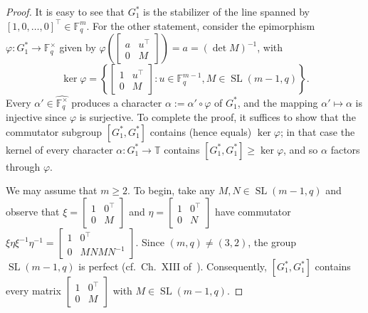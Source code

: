 \documentclass[11pt]{article}
\theoremstyle{definition}
\numberwithin{equation}{section}
\begin{document}
\begin{proof}
It is easy to see that $G_1^*$ is the stabilizer of the line spanned by $[1,0,\ldots,0]^\top\in\mathbb{F}_q^m$.
For the other statement, consider the epimorphism $\varphi \colon G_1^* \to \mathbb{F}_q^\times$ given by $\varphi\left( \begin{bmatrix} a & u^\top \\ 0 & M \end{bmatrix} \right) = a = (\det M)^{-1}$,
with
\[ \ker \varphi =\left\{
\begin{bmatrix}
1&u^\top\\0&M
\end{bmatrix}
:u\in\mathbb{F}_q^{m-1},M\in\operatorname{SL}(m-1,q)
\right\}.
\]
Every $\alpha' \in \widehat{ \mathbb{F}_q^\times }$ produces a character $\alpha := \alpha' \circ \varphi$ of $G_1^*$, and the mapping $\alpha' \mapsto \alpha$ is injective since $\varphi$ is surjective.
To complete the proof, it suffices to show that the commutator subgroup $[G_1^*,G_1^*]$ contains (hence equals) $\ker \varphi$;
in that case the kernel of every character $\alpha \colon G_1^* \to \mathbb{T}$ contains $[G_1^*, G_1^*] \geq \ker \varphi$, and so $\alpha$ factors through $\varphi$.

We may assume that $m \geq 2$.
To begin, take any $M,N \in \operatorname{SL}(m-1,q)$ and observe that $\xi = \begin{bmatrix} 1 & 0^\top \\ 0 & M \end{bmatrix}$ and $\eta = \begin{bmatrix} 1 & 0^\top \\ 0 & N \end{bmatrix}$ have commutator
$\xi \eta \xi^{-1} \eta^{-1} = \begin{bmatrix} 1 & 0^\top \\ 0 & MNMN^{-1} \end{bmatrix}$.
Since $(m,q) \neq (3,2)$, the group $\operatorname{SL}(m-1,q)$ is perfect (cf.\ Ch.~XIII of~\cite{Lang:02}).
Consequently, $[G_1^*,G_1^*]$ contains every matrix $\begin{bmatrix} 1 & 0^\top \\ 0 & M \end{bmatrix}$ with $M \in \operatorname{SL}(m-1,q)$.


\end{proof}
\end{document}
